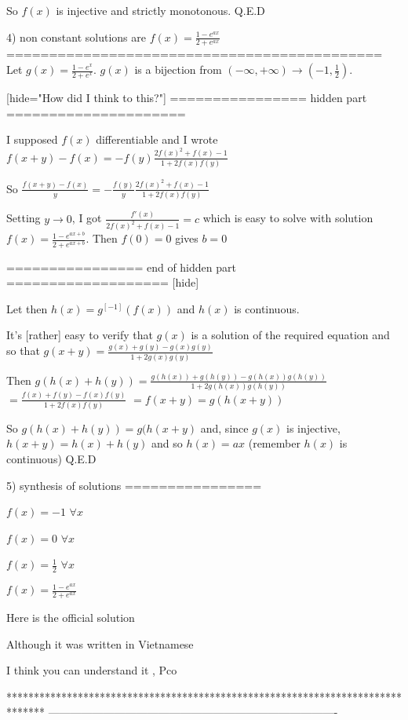 \begin{solution}
So $ f(x)$ is injective and strictly monotonous.
Q.E.D

4) non constant solutions are $ f(x)=\frac{1-e^{ax}}{2+e^{ax}}$
============================================
Let $ g(x)=\frac{1-e^{x}}{2+e^{x}}$. $ g(x)$ is a bijection from $ (-\infty,+\infty)\to(-1,\frac 12)$.

[hide="How did I think to this?"]
================  hidden part =====================

I supposed $ f(x)$ differentiable and I wrote $ f(x+y)-f(x)=-f(y)\frac{2f(x)^2+f(x)-1}{1+2f(x)f(y)}$

So $ \frac{f(x+y)-f(x)}y=-\frac{f(y)}y\frac{2f(x)^2+f(x)-1}{1+2f(x)f(y)}$

Setting $ y\to 0$, I got $ \frac{f'(x)}{{2f(x)^2+f(x)-1}}=c$ which is easy to solve with solution $ f(x)=\frac{1-e^{ax+b}}{2+e^{ax+b}}$. Then $ f(0)=0$ gives $ b=0$

================ end of hidden part ===================
[\/hide]

Let then $ h(x)=g^{[-1]}(f(x))$ and $ h(x)$ is continuous.

It's [rather] easy to verify that $ g(x)$ is a solution of the required equation and so that $ g(x+y)=\frac{g(x)+g(y)-g(x)g
(y)}{1+2g(x)g(y)}$

Then $ g(h(x)+h(y))=\frac{g(h(x))+g(h(y))-g(h(x))g(h(y))}{1+2g(h(x))g(h(y))}$ $ =\frac{f(x)+f(y)-f(x)f(y)}{1+2f(x)f(y)}$ $ =f(x+y)=g(h(x+y))$

So $ g(h(x)+h(y))=g(h(x+y)$ and, since $ g(x)$ is injective, $ h(x+y)=h(x)+h(y)$ and so $ h(x)=ax$ (remember $ h(x)$ is continuous)
Q.E.D

5) synthesis of solutions
================

$ f(x)=-1$ $ \forall x$

$ f(x)=0$ $ \forall x$

$ f(x)=\frac 12$ $ \forall x$

$ f(x)=\frac{1-e^{ax}}{2+e^{ax}}$
\end{solution}



\begin{solution}
	\begin{italicized}Here is the official solution

   Although it was written in Vietnamese 

   I think you can understand it , Pco  \end{italicized}
\end{solution}
*******************************************************************************
-------------------------------------------------------------------------------

